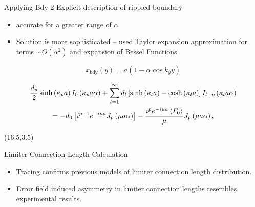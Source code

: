 \documentclass{beamer}
\begin{document}
\begin{frame}[t]
\begin{textblock}{15}
\begin{block}{Applying Bdy-2}
Explicit description of rippled boundary
\begin{itemize}
    \item accurate for a greater range of $\alpha$ 
    \item Solution is more sophisticated -- used Taylor expansion approximation for terms $\sim O(\alpha^2)$ and expansion of Bessel Functions
\end{itemize}
\begin{equation}
    \label{eq:bdy2}
    x_{\text{bdy}}\left( y \right) =a\left( 1-\alpha\cos{k_y y} \right) 
\end{equation} 

\begin{multline}
        \frac{d_p}{2}\sinh\left(\kappa_p a\right)I_{0}\left(\kappa_p a \alpha\right)+\sum_{l=1}^{\infty}d_l\left[ \sinh\left(\kappa_l a\right)-\cosh\left(\kappa_l a\right) \right]I_{l-p}\left(\kappa_l a \alpha\right)\\
        = -d_0\left[i^{p+1}e^{-i\mu a}J_{p}\left(\mu a \alpha\right)\right]-\frac{i^p e^{-i\mu a}\left\langle F_0 \right\rangle}{\mu}J_{p}\left(\mu a \alpha\right),\label{eq2.42}
\end{multline}
    
\end{block}

\break
\end{textblock}



\begin{textblock}{15}(16.5,3.5)
{\Large
\begin{block}{Limiter Connection Length Calculation}
\begin{itemize}
\item Tracing confirms previous models of limiter connection length distribution\cite{pederson}.
\item Error field induced asymmetry in limiter connection lengths resembles experimental results.
\end{itemize}
\end{block}
}


\end{textblock}


\end{frame}
\end{document}
